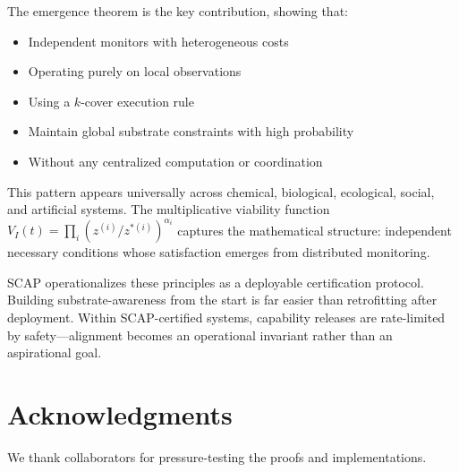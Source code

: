 \documentclass[11pt,a4paper]{article}
\begin{document}
The emergence theorem is the key contribution, showing that:
\begin{itemize}
\item Independent monitors with heterogeneous costs
\item Operating purely on local observations
\item Using a $k$-cover execution rule
\item Maintain global substrate constraints with high probability
\item Without any centralized computation or coordination
\end{itemize}

This pattern appears universally across chemical, biological, ecological, social, and artificial systems. The multiplicative viability function $V_I(t) = \prod_i (z^{(i)}/z^{*(i)})^{\alpha_i}$ captures the mathematical structure: independent necessary conditions whose satisfaction emerges from distributed monitoring.

SCAP operationalizes these principles as a deployable certification protocol. Building substrate-awareness from the start is far easier than retrofitting after deployment. Within SCAP-certified systems, capability releases are rate-limited by safety—alignment becomes an operational invariant rather than an aspirational goal.

\section*{Acknowledgments}

We thank collaborators for pressure-testing the proofs and implementations.
\end{document}
